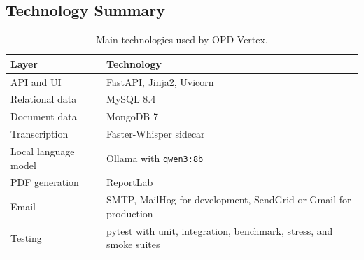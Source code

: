 \subsection{Technology Summary}

\begin{table}[h]
\centering
\begin{tabularx}{\textwidth}{@{}L{0.24\textwidth}Y@{}}
\toprule
\textbf{Layer} & \textbf{Technology} \\
\midrule
API and UI & FastAPI, Jinja2, Uvicorn \\
Relational data & MySQL 8.4 \\
Document data & MongoDB 7 \\
Transcription & Faster-Whisper sidecar \\
Local language model & Ollama with \texttt{qwen3:8b} \\
PDF generation & ReportLab \\
Email & SMTP, MailHog for development, SendGrid or Gmail for production \\
Testing & pytest with unit, integration, benchmark, stress, and smoke suites \\
\bottomrule
\end{tabularx}
\caption{Main technologies used by OPD-Vertex.}
\end{table}